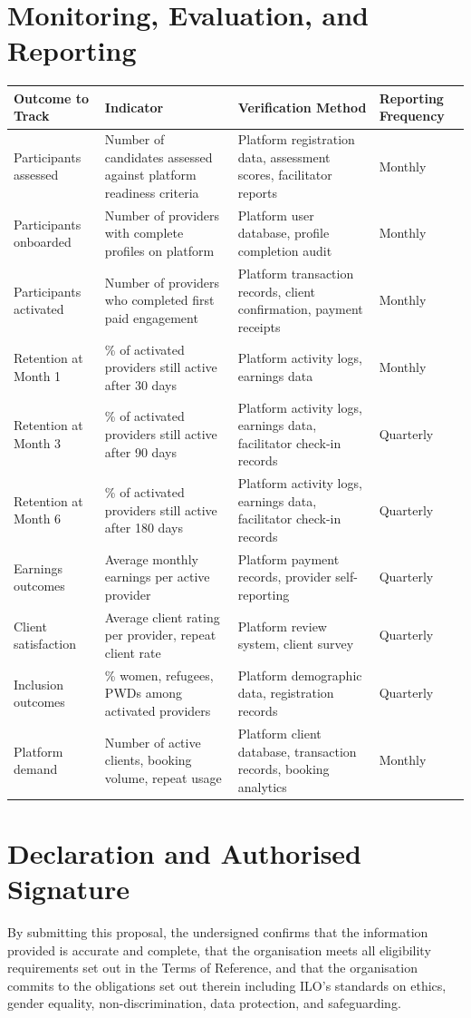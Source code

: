 \documentclass[11pt,a4paper]{article}
\begin{document}
\section{Monitoring, Evaluation, and Reporting}
\begin{longtable}{@{}p{4cm}p{4cm}p{4cm}p{3cm}@{}}
\textbf{Outcome to Track} & \textbf{Indicator} & \textbf{Verification Method} & \textbf{Reporting Frequency} \\
\hline
Participants assessed & Number of candidates assessed against platform readiness criteria & Platform registration data, assessment scores, facilitator reports & Monthly \\
\hline
Participants onboarded & Number of providers with complete profiles on platform & Platform user database, profile completion audit & Monthly \\
\hline
Participants activated & Number of providers who completed first paid engagement & Platform transaction records, client confirmation, payment receipts & Monthly \\
\hline
Retention at Month 1 & \% of activated providers still active after 30 days & Platform activity logs, earnings data & Monthly \\
\hline
Retention at Month 3 & \% of activated providers still active after 90 days & Platform activity logs, earnings data, facilitator check-in records & Quarterly \\
\hline
Retention at Month 6 & \% of activated providers still active after 180 days & Platform activity logs, earnings data, facilitator check-in records & Quarterly \\
\hline
Earnings outcomes & Average monthly earnings per active provider & Platform payment records, provider self-reporting & Quarterly \\
\hline
Client satisfaction & Average client rating per provider, repeat client rate & Platform review system, client survey & Quarterly \\
\hline
Inclusion outcomes & \% women, refugees, PWDs among activated providers & Platform demographic data, registration records & Quarterly \\
\hline
Platform demand & Number of active clients, booking volume, repeat usage & Platform client database, transaction records, booking analytics & Monthly \\
\end{longtable}

\section{Declaration and Authorised Signature}
\noindent By submitting this proposal, the undersigned confirms that the information provided is accurate and complete, that the organisation meets all eligibility requirements set out in the Terms of Reference, and that the organisation commits to the obligations set out therein including ILO's standards on ethics, gender equality, non-discrimination, data protection, and safeguarding.
\end{document}
